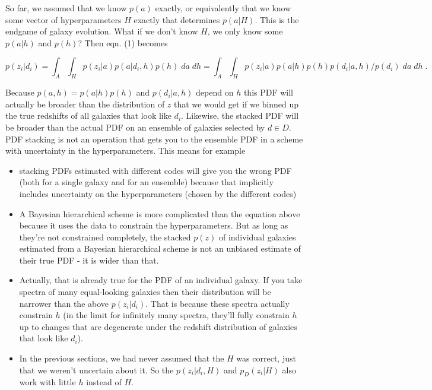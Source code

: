 \documentclass[11pt]{amsart}
\begin{document}
So far, we assumed that we know $p(a)$ exactly, or equivalently that we know some vector of hyperparameters $H$ exactly that determines $p(a|H)$. This is the endgame of galaxy evolution. What if we don't know $H$, we only know some $p(a|h)$ and $p(h)$? Then eqn. (1) becomes

\begin{equation}
p(z_i|d_i)=\int_{A}\int_{H} p(z_i|a) p(a|d_i,h) p(h) \; da\; dh = \int_{A}\int_{H} p(z_i|a) p(a|h) p(h) p(d_i|a,h) / p(d_i) \; da \; dh \; .
\end{equation}

Because $p(a,h)=p(a|h)p(h)$ and $p(d_i|a,h)$ depend on $h$ this PDF will actually be broader than the distribution of $z$ that we would get if we binned up the true redshifts of all galaxies that look like $d_i$. Likewise, the stacked PDF will be broader than the actual PDF on an ensemble of galaxies selected by $d\in D$. PDF stacking is not an operation that gets you to the ensemble PDF in a scheme with uncertainty in the hyperparameters. This means for example
\begin{itemize}
\item stacking PDFs estimated with different codes will give you the wrong PDF (both for a single galaxy and for an ensemble) because that implicitly includes uncertainty on the hyperparameters (chosen by the different codes)
\item A Bayesian hierarchical scheme is more complicated than the equation above because it uses the data to constrain the hyperparameters. But as long as they're not constrained completely, the stacked $p(z)$ of individual galaxies estimated from a Bayesian hierarchical scheme is not an unbiased estimate of their true PDF - it is wider than that. 
\item Actually, that is already true for the PDF of an individual galaxy. If you take spectra of many equal-looking galaxies then their distribution will be narrower than the above $p(z_i|d_i)$. That is because these spectra actually constrain $h$ (in the limit for infinitely many spectra, they'll fully constrain $h$ up to changes that are degenerate under the redshift distribution of galaxies that look like $d_i$).
\item In the previous sections, we had never assumed that the $H$ was correct, just that we weren't uncertain about it. So the $p(z_i|d_i,H)$ and $p_D(z_i|H)$ also work with little $h$ instead of $H$.
\end{itemize}



\end{document}
